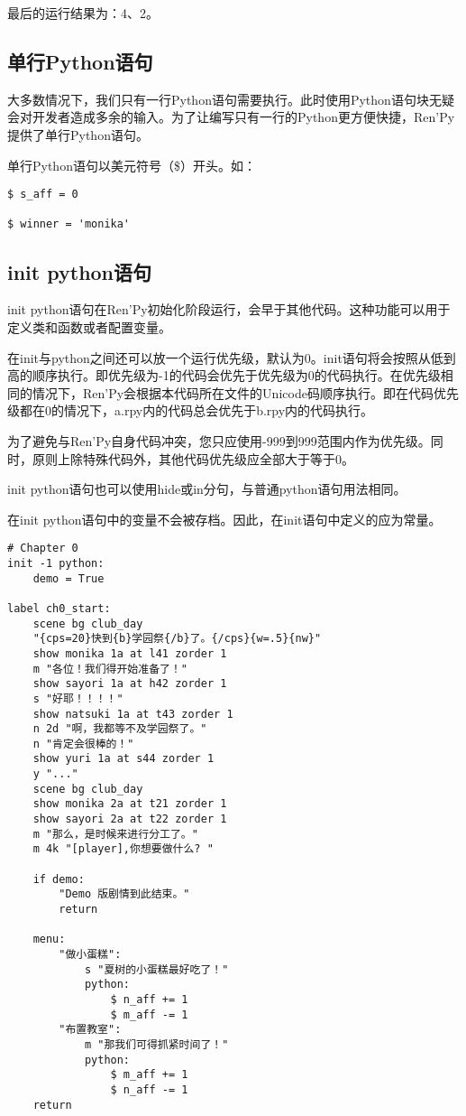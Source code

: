 最后的运行结果为：4、2。

\subsection{单行Python语句}
大多数情况下，我们只有一行Python语句需要执行。此时使用Python语句块无疑会对开发者造成多余的输入。为了让编写只有一行的Python更方便快捷，Ren'Py提供了单行Python语句。

单行Python语句以美元符号（\$）开头。如：
\begin{lstlisting}
$ s_aff = 0

$ winner = 'monika'
\end{lstlisting}

\subsection{init python语句}
init python语句在Ren'Py初始化阶段运行，会早于其他代码。这种功能可以用于定义类和函数或者配置变量。
\begin{ExtraKnowledge}
    在init与python之间还可以放一个运行优先级，默认为0。init语句将会按照从低到高的顺序执行。即优先级为-1的代码会优先于优先级为0的代码执行。在优先级相同的情况下，Ren'Py会根据本代码所在文件的Unicode码顺序执行。即在代码优先级都在0的情况下，a.rpy内的代码总会优先于b.rpy内的代码执行。
\end{ExtraKnowledge}

\begin{Attention}
    为了避免与Ren'Py自身代码冲突，您只应使用-999到999范围内作为优先级。同时，原则上除特殊代码外，其他代码优先级应全部大于等于0。
\end{Attention}

init python语句也可以使用hide或in分句，与普通python语句用法相同。

在init python语句中的变量不会被存档。因此，在init语句中定义的应为常量。

\begin{lstlisting}
# Chapter 0
init -1 python:
    demo = True

label ch0_start:
    scene bg club_day
    "{cps=20}快到{b}学园祭{/b}了。{/cps}{w=.5}{nw}"
    show monika 1a at l41 zorder 1
    m "各位！我们得开始准备了！"
    show sayori 1a at h42 zorder 1
    s "好耶！！！！"
    show natsuki 1a at t43 zorder 1
    n 2d "啊，我都等不及学园祭了。"
    n "肯定会很棒的！"
    show yuri 1a at s44 zorder 1
    y "..."
    scene bg club_day
    show monika 2a at t21 zorder 1
    show sayori 2a at t22 zorder 1
    m "那么，是时候来进行分工了。"
    m 4k "[player],你想要做什么? "

    if demo:
        "Demo 版剧情到此结束。"
        return

    menu:
        "做小蛋糕":
            s "夏树的小蛋糕最好吃了！"
            python:
                $ n_aff += 1
                $ m_aff -= 1
        "布置教室":
            m "那我们可得抓紧时间了！"
            python:
                $ m_aff += 1
                $ n_aff -= 1
    return

\end{lstlisting}

